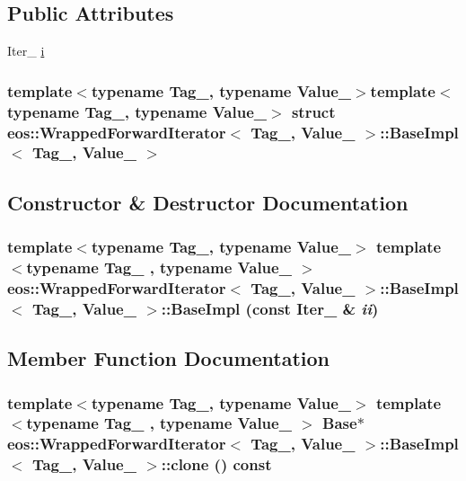 \subsection*{Public Attributes}
\begin{DoxyCompactItemize}
\item 
Iter\_\- \hyperlink{structeos_1_1WrappedForwardIterator_1_1BaseImpl_a1cb305ebb3b36e941fc5f74b78e4b8a1}{i}
\end{DoxyCompactItemize}
\subsubsection*{template$<$typename Tag\_\-, typename Value\_\-$>$template$<$typename Tag\_\-, typename Value\_\-$>$ struct eos::WrappedForwardIterator$<$ Tag\_\-, Value\_\- $>$::BaseImpl$<$ Tag\_\-, Value\_\- $>$}



\subsection{Constructor \& Destructor Documentation}
\hypertarget{structeos_1_1WrappedForwardIterator_1_1BaseImpl_ace18b4460fe774ada155046312de5ad6}{
\subsubsection[{BaseImpl}]{\setlength{\rightskip}{0pt plus 5cm}template$<$typename Tag\_\-, typename Value\_\-$>$ template$<$typename Tag\_\- , typename Value\_\- $>$ {\bf eos::WrappedForwardIterator}$<$ Tag\_\-, Value\_\- $>$::{\bf BaseImpl}$<$ Tag\_\-, Value\_\- $>$::{\bf BaseImpl} (const Iter\_\- \& {\em ii})}}
\label{structeos_1_1WrappedForwardIterator_1_1BaseImpl_ace18b4460fe774ada155046312de5ad6}


\subsection{Member Function Documentation}
\hypertarget{structeos_1_1WrappedForwardIterator_1_1BaseImpl_afe3d32be8e6bd2788db24f89e90ceef9}{
\subsubsection[{clone}]{\setlength{\rightskip}{0pt plus 5cm}template$<$typename Tag\_\-, typename Value\_\-$>$ template$<$typename Tag\_\- , typename Value\_\- $>$ {\bf Base}$\ast$ {\bf eos::WrappedForwardIterator}$<$ Tag\_\-, Value\_\- $>$::{\bf BaseImpl}$<$ Tag\_\-, Value\_\- $>$::clone () const}}
\label{structeos_1_1WrappedForwardIterator_1_1BaseImpl_afe3d32be8e6bd2788db24f89e90ceef9}


